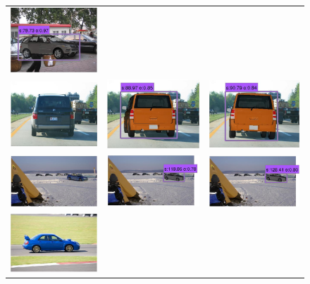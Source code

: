 \documentclass[10pt,twocolumn,letterpaper]{article}
\begin{document}
\begin{figure}[h]
\begin{tabular}{ccc}
  \includegraphics[width=0.22\linewidth]{supp/tuning_3c.png}  \\   
  \includegraphics[width=0.22\linewidth]{supp/tuning_4a.png} &
  \includegraphics[width=0.22\linewidth]{supp/tuning_4b.png} & 
  \includegraphics[width=0.22\linewidth]{supp/tuning_4c.png}  \\     
  \includegraphics[width=0.22\linewidth]{supp/tuning_5a.png} &
  \includegraphics[width=0.22\linewidth]{supp/tuning_5b.png} & 
  \includegraphics[width=0.22\linewidth]{supp/tuning_5c.png}  \\
  \includegraphics[width=0.22\linewidth]{supp/tuning_6a.png} &

\end{tabular}
\end{figure}
\end{document}
